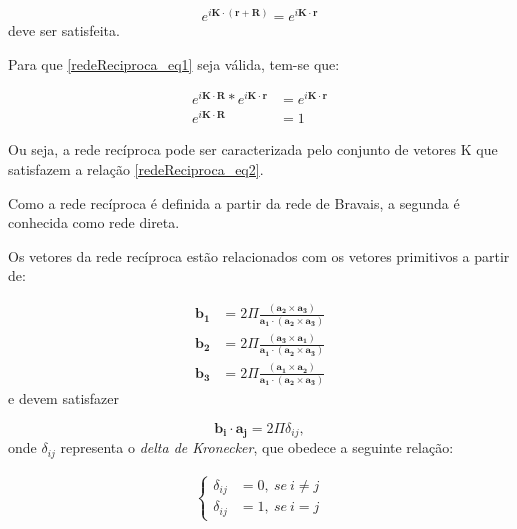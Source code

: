 \documentclass[11pt]{article}
\numberwithin{equation}{section}
\begin{document}
      \begin{equation}\label{redeReciproca_eq1}
        e^{i\mathbf{K}\cdot (\mathbf{r}+\mathbf{R})} = e^{i\mathbf{K}\cdot\mathbf{r}}
      \end{equation}
      deve ser satisfeita.

      Para que \eqref{redeReciproca_eq1} seja válida, tem-se que:

      \begin{align}\label{redeReciproca_eq2}
        e^{i\mathbf{K}\cdot\mathbf{R}}\ast e^{i\mathbf{K}\cdot\mathbf{r}} &= e^{i\mathbf{K}\cdot\mathbf{r}}\\
        e^{i\mathbf{K}\cdot\mathbf{R}}                                    &= 1
      \end{align}

      Ou seja, a rede recíproca pode ser caracterizada pelo conjunto de vetores K que satisfazem a relação \eqref{redeReciproca_eq2}. 
      
      Como a rede recíproca é definida a partir da rede de Bravais, a segunda é conhecida como rede direta.
      
      Os vetores da rede recíproca estão relacionados com os vetores primitivos a partir de:
      
      \begin{align}\label{redeReciproca_eq3}
        \mathbf{b_{1}} &= 2 \Pi \frac{(\mathbf{a_{2}} \times \mathbf{a_{3}})} {\mathbf{a_{1}} \cdot (\mathbf{a_{2}} \times \mathbf{a_{3}})}\\
        \mathbf{b_{2}} &= 2 \Pi \frac{(\mathbf{a_{3}} \times \mathbf{a_{1}})} {\mathbf{a_{1}} \cdot (\mathbf{a_{2}} \times \mathbf{a_{3}})}\\
        \mathbf{b_{3}} &= 2 \Pi \frac{(\mathbf{a_{1}} \times \mathbf{a_{2}})} {\mathbf{a_{1}} \cdot (\mathbf{a_{2}} \times \mathbf{a_{3}})}
      \end{align}
      e devem satisfazer

      \begin{equation}\label{redeReciproca_eq4}
        \mathbf{b_{i}}\cdot \mathbf{a_{j}} = 2\Pi \delta_{ij},
      \end{equation}
      onde $\delta_{ij}$ representa o \textit{delta de Kronecker}, que obedece a seguinte relação:

      \begin{align}\label{delta_kronecker_sistema}
        \left\{
          \begin{array}{ll}
            \displaystyle \delta_{ij} &= 0,\ se \ i\neq j\\
            \displaystyle \delta_{ij} &= 1,\ se \ i = j
          \end{array}
        \right.
      \end{align}
\end{document}
